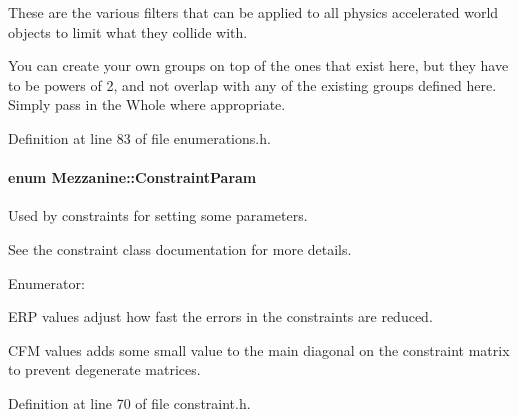 These are the various filters that can be applied to all physics accelerated world objects to limit what they collide with. 

You can create your own groups on top of the ones that exist here, but they have to be powers of 2, and not overlap with any of the existing groups defined here. Simply pass in the Whole where appropriate. 

Definition at line 83 of file enumerations.h.

\hypertarget{namespaceMezzanine_a6c62e8c2938fb203eb7a7072c12176f4}{
\paragraph[{ConstraintParam}]{\setlength{\rightskip}{0pt plus 5cm}enum {\bf Mezzanine::ConstraintParam}}\hfill}
\label{namespaceMezzanine_a6c62e8c2938fb203eb7a7072c12176f4}


Used by constraints for setting some parameters. 

See the constraint class documentation for more details. \begin{Desc}
\item[Enumerator: ]\par
\begin{description}
\item[{\em 
\hypertarget{namespaceMezzanine_a6c62e8c2938fb203eb7a7072c12176f4aa7c686c7bf5328e60c31d6ab05c3dc90}{
Con\_\-ERP}
\label{namespaceMezzanine_a6c62e8c2938fb203eb7a7072c12176f4aa7c686c7bf5328e60c31d6ab05c3dc90}
}]ERP values adjust how fast the errors in the constraints are reduced. \item[{\em 
\hypertarget{namespaceMezzanine_a6c62e8c2938fb203eb7a7072c12176f4a0ae9de16fc96d34ee601f9516d43b9b8}{
Con\_\-CFM}
\label{namespaceMezzanine_a6c62e8c2938fb203eb7a7072c12176f4a0ae9de16fc96d34ee601f9516d43b9b8}
}]CFM values adds some small value to the main diagonal on the constraint matrix to prevent degenerate matrices. \end{description}
\end{Desc}



Definition at line 70 of file constraint.h.

